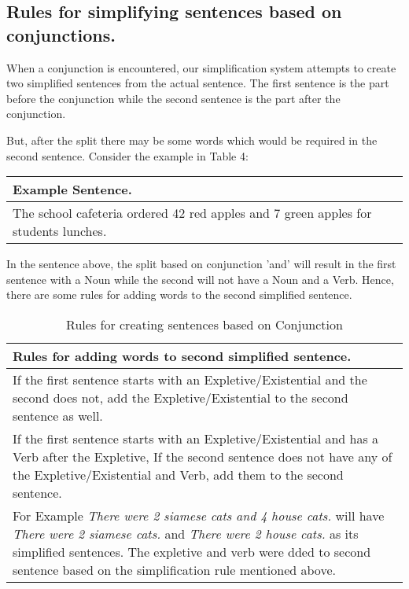 \documentclass[11pt]{article}
\begin{document}
\subsection{Rules for simplifying sentences based on conjunctions.}
 When a conjunction is encountered, our simplification system attempts to create two simplified sentences from the actual sentence. The first sentence is the part before the conjunction while the second sentence is the part after the conjunction.

But, after the split there may be some words which would be required in the second sentence. Consider the example in Table 4:

\begin{table}[h!]
\centering
\begin{tabular}{ | m{25em} | }
\hline
 \textbf{Example Sentence.}\\
\hline
The school cafeteria ordered 42 red apples and 7 green apples for students lunches.\\
\hline
\end{tabular}
\label{table:4}
\end{table}

In the sentence above, the split based on conjunction 'and' will result in the first sentence with a Noun while the second will not have a Noun and a Verb. Hence, there are some rules for adding words to the second simplified sentence.

\begin{table}[h!]
\centering
\begin{tabular}{ | m{30em} | }
\hline
 \textbf{Rules for adding words to second simplified sentence.}\\
\hline
 If the first sentence starts with an Expletive/Existential and the second does not, add the Expletive/Existential to the second sentence as well.\\
\hline
If the first sentence starts with an Expletive/Existential and has a Verb after the Expletive, If the second sentence does not have any of the Expletive/Existential and Verb, add them to the second sentence.\\
\hline
 For Example \textit{There were 2 siamese cats and 4 house cats.} will have \textit{ There were 2 siamese cats.} and \textit{ There were 2 house cats.} as its simplified sentences. The expletive and verb were dded to second sentence based on the simplification rule mentioned above.\\
\hline
\end{tabular}
\caption{Rules for creating sentences based on Conjunction}
\label{table:5}
\end{table}

\newpage


\end{document}
